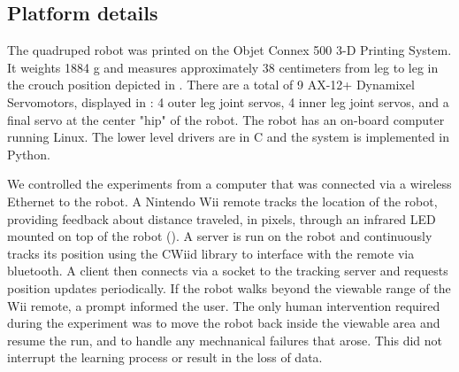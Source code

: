 \subsection{Platform details}













The quadruped robot was printed on the Objet
Connex 500 3-D Printing System. It weights 1884 g and measures approximately
38 centimeters from leg to leg in the crouch position depicted in
. There are a total of 9 AX-12+ Dynamixel
Servomotors, displayed in : 4 outer leg joint
servos, 4 inner leg joint servos, and a final servo at the center "hip" of the
robot. The robot has an on-board computer running Linux. 
The lower level drivers are in C and the system is implemented in Python. 


We controlled the experiments from a computer that was connected via a
wireless Ethernet to the robot. A Nintendo Wii remote tracks the location 
of the robot, providing feedback
about distance traveled, in pixels, through an infrared LED mounted on top of 
the robot (). A server is run on the robot and continuously tracks its
position using the CWiid library\cite{cwiid} to interface with the remote
via bluetooth. A client then connects via a socket to the tracking
server and requests position updates periodically. If the robot walks 
beyond the viewable range of the Wii remote, a prompt informed the
user. The only human intervention required during the
experiment was to move the robot back inside the viewable area and resume
the run, and to handle any mechnanical failures that arose. This did not
interrupt the learning process or result in the loss of data.

